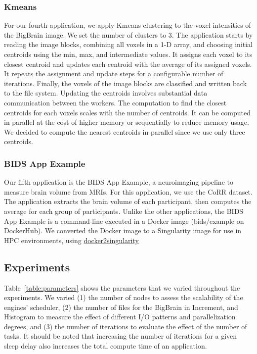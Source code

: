 \documentclass[conference]{IEEEtran}
\begin{document}
\subsubsection{Kmeans}
For our fourth application, we apply Kmeans clustering to the voxel
intensities of the BigBrain image. We set the number of clusters to 3. The
application starts by reading the image blocks, combining all voxels in a
1-D array, and choosing initial centroids using the min, max, and
intermediate values. It assigns each voxel to its closest centroid and
updates each centroid with the average of its assigned voxels. It repeats
the assignment and update steps for a configurable number of iterations.
Finally, the voxels of the image blocks are classified and written back to
the file system. Updating the centroids involves substantial data
communication between the workers.
The computation to find the closest centroids for each voxels scales with the number of centroids.
It can be computed in parallel at the cost of higher memory or sequentially to reduce memory usage.
We decided to compute the nearest centroids in parallel since we use only three centroids.

\subsubsection{BIDS App Example}
Our fifth application is the BIDS App Example, a neuroimaging pipeline to
measure brain volume from MRIs. For this application, we use the CoRR
dataset. The application extracts the brain volume of each participant,
then computes the average for each group of participants. Unlike the other
applications, the BIDS App Example is a command-line executed in a Docker image
(bids/example on DockerHub). We converted the Docker image to a Singularity
image for use in HPC environments, using
\href{https://hub.docker.com/r/singularityware/docker2singularity/tags/}{docker2singularity}
		
\subsection{Experiments}
Table~\ref{table:parameters} shows the parameters that we varied
throughout the experiments. We varied (1) the number of nodes to assess
the scalability of the engines' scheduler, (2) the number of files for the BigBrain
in Increment, and Histogram to measure the
effect of different I/O patterns and parallelization degrees, and (3) the
number of iterations to evaluate the effect of the number of tasks.
It should be noted that increasing the number of iterations for a given sleep 
delay also increases the total compute time of an application.
		
\end{document}
